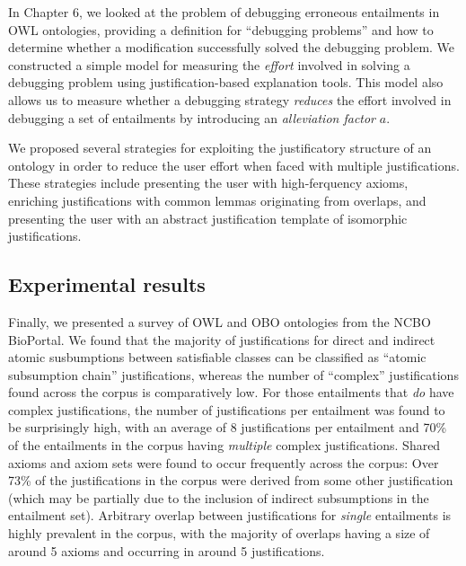 In Chapter 6, we looked at the problem of debugging erroneous entailments in OWL ontologies, providing a definition for \enquote{debugging problems} and how to determine whether a modification successfully solved the debugging problem. We constructed a simple model for measuring the \emph{effort} involved in solving a debugging problem using justification-based explanation tools. This model also allows us to measure whether a debugging strategy \emph{reduces} the effort involved in debugging a set of entailments by introducing an \emph{alleviation factor} $a$. 

We proposed several strategies for exploiting the justificatory structure of an ontology in order to reduce the user effort when faced with multiple justifications. These strategies include presenting the user with high-ferquency axioms, enriching justifications with common lemmas originating from overlaps, and presenting the user with an abstract justification template of isomorphic justifications.

\subsection{Experimental results}

Finally, we presented a survey of OWL and OBO ontologies from the NCBO BioPortal. We found that the majority of justifications for direct and indirect atomic susbumptions between satisfiable classes can be classified as \enquote{atomic subsumption chain} justifications, whereas the number of \enquote{complex} justifications found across the corpus is comparatively low. For those entailments that \emph{do} have complex justifications, the number of justifications per entailment was found to be surprisingly high, with an average of 8 justifications per entailment  and 70\% of the entailments in the corpus having \emph{multiple} complex justifications. Shared axioms and axiom sets were found to occur frequently across the corpus: Over 73\% of the justifications in the corpus were derived from some other justification (which may be partially due to the inclusion of indirect subsumptions in the entailment set). Arbitrary overlap between justifications for \emph{single} entailments is highly prevalent in the corpus, with the majority of overlaps having a size of around 5 axioms and occurring in around 5 justifications. 

